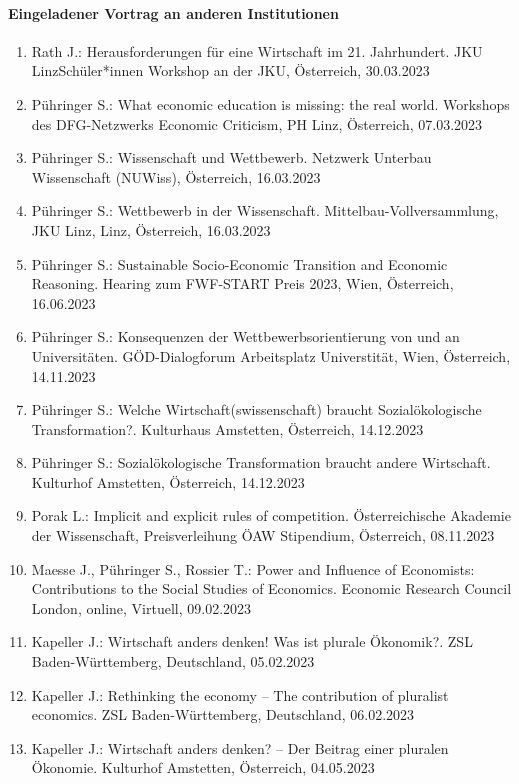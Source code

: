\paragraph{Eingeladener Vortrag an anderen Institutionen}
\begin{enumerate}
	\item Rath J.: Herausforderungen für eine Wirtschaft im 21. Jahrhundert. JKU LinzSchüler*innen Workshop an der JKU, Österreich, 30.03.2023
	\item Pühringer S.: What economic education is missing: the real world. Workshops des DFG-Netzwerks Economic Criticism, PH Linz, Österreich, 07.03.2023
	\item Pühringer S.: Wissenschaft und Wettbewerb. Netzwerk Unterbau Wissenschaft (NUWiss), Österreich, 16.03.2023
	\item Pühringer S.: Wettbewerb in der Wissenschaft. Mittelbau-Vollversammlung, JKU Linz, Linz, Österreich, 16.03.2023
	\item Pühringer S.: Sustainable Socio-Economic Transition and Economic Reasoning. Hearing zum FWF-START Preis 2023, Wien, Österreich, 16.06.2023
	\item Pühringer S.: Konsequenzen der Wettbewerbsorientierung von und an Universitäten. GÖD-Dialogforum Arbeitsplatz Universtität, Wien, Österreich, 14.11.2023
	\item Pühringer S.: Welche Wirtschaft(swissenschaft) braucht Sozialökologische Transformation?. Kulturhaus Amstetten, Österreich, 14.12.2023
	\item Pühringer S.: Sozialökologische Transformation braucht andere Wirtschaft. Kulturhof Amstetten, Österreich, 14.12.2023
	\item Porak L.: Implicit and explicit rules of competition. Österreichische Akademie der Wissenschaft, Preisverleihung ÖAW Stipendium, Österreich, 08.11.2023
	\item Maesse J., Pühringer S., Rossier T.: Power and Influence of Economists: Contributions to the Social Studies of Economics. Economic Research Council London, online, Virtuell, 09.02.2023
	\item Kapeller J.: Wirtschaft anders denken! Was ist plurale Ökonomik?. ZSL Baden-Württemberg, Deutschland, 05.02.2023
	\item Kapeller J.: Rethinking the economy – The contribution of pluralist economics. ZSL Baden-Württemberg, Deutschland, 06.02.2023
	\item Kapeller J.: Wirtschaft anders denken? – Der Beitrag einer pluralen Ökonomie. Kulturhof Amstetten, Österreich, 04.05.2023

\end{enumerate}
